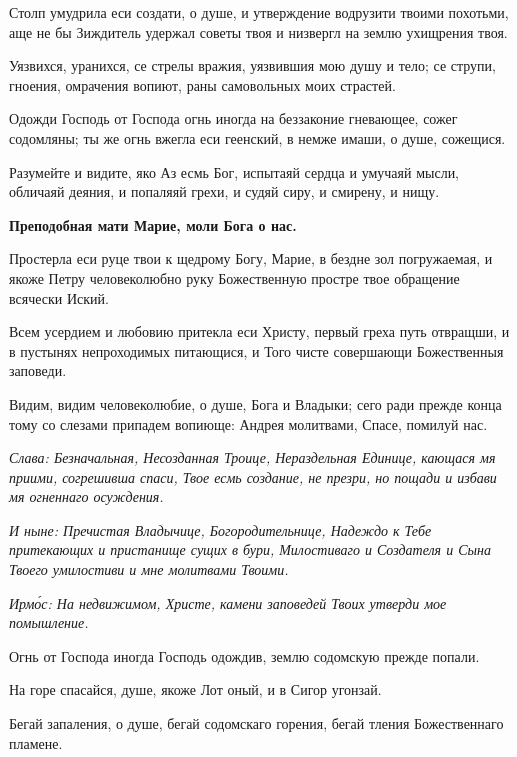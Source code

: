 Столп умудрила еси создати, о душе, и утверждение водрузити твоими похотьми, аще не бы Зиждитель удержал советы твоя и низвергл на землю ухищрения твоя.

Уязвихся, уранихся, се стрелы вражия, уязвившия мою душу и тело; се струпи, гноения, омрачения вопиют, раны самовольных моих страстей.

Одожди Господь от Господа огнь иногда на беззаконие гневающее, сожег содомляны; ты же огнь вжегла еси геенский, в немже имаши, о душе, сожещися.

Разумейте и видите, яко Аз есмь Бог, испытаяй сердца и умучаяй мысли, обличаяй деяния, и попаляяй грехи, и судяй сиру, и смирену, и нищу.

\bfseries Преподобная мати Марие, моли Бога о нас.

\normalfont{}Простерла еси руце твои к щедрому Богу, Марие, в бездне зол погружаемая, и якоже Петру человеколюбно руку Божественную простре твое обращение всячески Иский.


Всем усердием и любовию притекла еси Христу, первый греха путь отвращши, и в пустынях непроходимых питающися, и Того чисте совершающи Божественныя заповеди.


Видим, видим человеколюбие, о душе, Бога и Владыки; сего ради прежде конца тому со слезами припадем вопиюще: Андрея молитвами, Спасе, помилуй нас.

\itshape Слава\normalfont{}: Безначальная, Несозданная Троице, Нераздельная Единице, кающася мя приими, согрешивша спаси, Твое есмь создание, не презри, но пощади и избави мя огненнаго осуждения.

\itshape И ныне\normalfont{}: Пречистая Владычице, Богородительнице, Надеждо к Тебе притекающих и пристанище сущих в бури, Милостиваго и Создателя и Сына Твоего умилостиви и мне молитвами Твоими. 


\itshape Ирм\'{о}с\normalfont{}: На недвижимом, Христе, камени заповедей Твоих утверди мое помышление.

Огнь от Господа иногда Господь одождив, землю содомскую прежде попали.

На горе спасайся, душе, якоже Лот оный, и в Сигор угонзай.

Бегай запаления, о душе, бегай содомскаго горения, бегай тления Божественнаго пламене.

